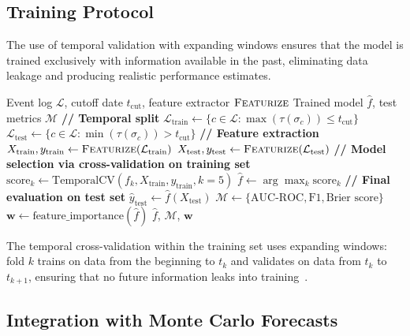 \subsection{Training Protocol}
\label{sec:ml-training}

The use of temporal validation with expanding windows ensures that the model is trained exclusively with information available in the past, eliminating data leakage and producing realistic performance estimates.

\begin{algorithm}[htbp]
\caption{ML Training with Temporal Hold-Out}
\label{alg:ml-training}
\begin{algorithmic}[1]
\REQUIRE Event log $\mathcal{L}$, cutoff date $t_{\text{cut}}$, 
    feature extractor $\textsc{Featurize}$
\ENSURE Trained model $\hat{f}$, test metrics $\mathcal{M}$
\STATE \textbf{// Temporal split}
\STATE $\mathcal{L}_{\text{train}} \gets \{c \in \mathcal{L} : 
    \max(\tau(\sigma_c)) \leq t_{\text{cut}}\}$
\STATE $\mathcal{L}_{\text{test}} \gets \{c \in \mathcal{L} : 
    \min(\tau(\sigma_c)) > t_{\text{cut}}\}$
\STATE \textbf{// Feature extraction}
\STATE $X_{\text{train}}, y_{\text{train}} \gets 
    \textsc{Featurize}(\mathcal{L}_{\text{train}})$
\STATE $X_{\text{test}}, y_{\text{test}} \gets 
    \textsc{Featurize}(\mathcal{L}_{\text{test}})$
\STATE \textbf{// Model selection via cross-validation on training set}
    \STATE $\text{score}_k \gets \text{TemporalCV}(f_k, X_{\text{train}}, 
        y_{\text{train}}, k=5)$
\ENDFOR
\STATE $\hat{f} \gets \arg\max_k \text{score}_k$
\STATE \textbf{// Final evaluation on test set}
\STATE $\hat{y}_{\text{test}} \gets \hat{f}(X_{\text{test}})$
\STATE $\mathcal{M} \gets \{\text{AUC-ROC}, \text{F1}, \text{Brier score}\}$
\STATE $\mathbf{w} \gets \text{feature\_importance}(\hat{f})$
\RETURN $\hat{f}$, $\mathcal{M}$, $\mathbf{w}$
\end{algorithmic}
\end{algorithm}

The temporal cross-validation within the training set uses expanding 
windows: fold $k$ trains on data from the beginning to $t_k$ and 
validates on data from $t_k$ to $t_{k+1}$, ensuring that no future 
information leaks into training~\cite{tashman2000out, hyndman2021forecasting}.


\subsection{Integration with Monte Carlo Forecasts}
\label{sec:ml-integration}

